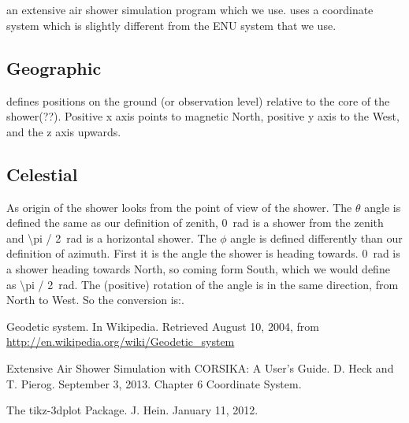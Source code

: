 \section{\corsika}

\corsika an extensive air shower simulation program which we use.
\corsika uses a coordinate system which is slightly different from the
ENU system that we use\cite{corsika}.


\subsection{Geographic}

\corsika defines positions on the ground (or observation level) relative
to the core of the shower(??). Positive x axis points to magnetic North,
positive y axis to the West, and the z axis upwards.


\subsection{Celestial}

As origin of the shower \corsika looks from the point of view of the
shower. The $\theta$ angle is defined the same as our definition of
zenith, \SI{0}{\radian} is a shower from the zenith and
\SI{\pi / 2}{\radian} is a horizontal shower. The $\phi$ angle is
defined differently than our definition of azimuth. First it is the
angle the shower is heading towards. \SI{0}{\radian} is a shower heading
towards North, so coming form South, which we would define as
\SI{\pi / 2}{\radian}. The (positive) rotation of the angle is
in the same direction, from North to West. So the conversion is:.




\begin{thebibliography}{9}

Geodetic system. In Wikipedia. Retrieved August 10, 2004,
from \url{http://en.wikipedia.org/wiki/Geodetic_system}

Extensive Air Shower Simulation with CORSIKA: A User’s Guide. D. Heck
and T. Pierog. September 3, 2013. Chapter 6 Coordinate System.

The tikz-3dplot Package. J. Hein. January 11, 2012.

\end{thebibliography}
